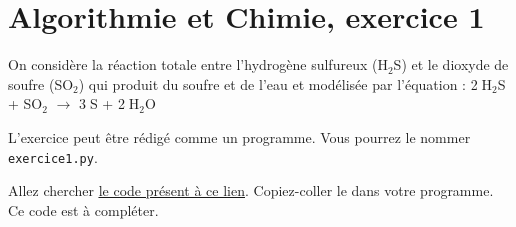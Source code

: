 \documentclass[11pt]{article}
\begin{document}
\newpage

\section{Algorithmie et Chimie, exercice 1}





\bigskip


On considère la réaction totale entre l’hydrogène sulfureux (H$_2$S) et le dioxyde de soufre (SO$_2$) qui  produit du soufre et de l’eau et modélisée par l'équation : 
2$\;$H$_2$S  + SO$_2$ $\longrightarrow$ 3$\;$S + 2$\;$H$_2$O


\medskip
L'exercice peut être rédigé comme un programme. Vous pourrez le nommer \texttt{exercice1.py}. 

\medskip

Allez chercher \href{https://github.com/formationPythonPC-Juin/aides-formation/blob/master/exercice1-aide.py}{\underline{le code présent à ce lien}}. Copiez-coller le dans votre programme. Ce code est à compléter.
\end{document}
